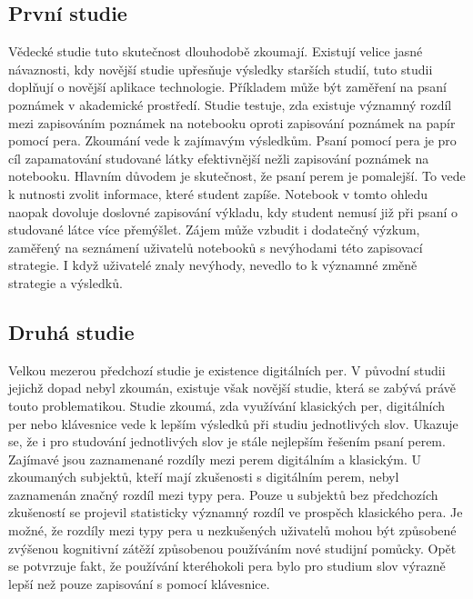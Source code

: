 \documentclass[journal]{IEEEtran}
\begin{document}
\subsection{První studie}
Vědecké studie tuto skutečnost dlouhodobě zkoumají.
Existují velice jasné návaznosti, kdy novější studie upřesňuje výsledky starších studií, tuto studii doplňují o novější aplikace technologie.
Příkladem může být zaměření na psaní poznámek v akademické prostředí.\cite{mightier_pen}
Studie testuje, zda existuje významný rozdíl mezi zapisováním poznámek na notebooku oproti zapisování poznámek na papír pomocí pera.
Zkoumání vede k zajímavým výsledkům.
Psaní pomocí pera je pro cíl zapamatování studované látky efektivnější nežli zapisování poznámek na notebooku.
Hlavním důvodem je skutečnost, že psaní perem je pomalejší.
To vede k nutnosti zvolit informace, které student zapíše.
Notebook v tomto ohledu naopak dovoluje doslovné zapisování výkladu, kdy student nemusí již při psaní o studované látce více přemýšlet.
Zájem může vzbudit i dodatečný výzkum, zaměřený na seznámení uživatelů notebooků s nevýhodami této zapisovací strategie.
I když uživatelé znaly nevýhody, nevedlo to k významné změně strategie a výsledků.

\subsection{Druhá studie}
Velkou mezerou předchozí studie je existence digitálních per.
V původní studii jejichž dopad nebyl zkoumán, existuje však novější studie, která se zabývá právě touto problematikou.
Studie zkoumá, zda využívání klasických per, digitálních per nebo klávesnice vede k lepším výsledků při studiu jednotlivých slov.\cite{advantage_of_handwriting}
Ukazuje se, že i pro studování jednotlivých slov je stále nejlepším řešením psaní perem.
Zajímavé jsou zaznamenané rozdíly mezi perem digitálním a klasickým.
U zkoumaných subjektů, kteří mají zkušenosti s digitálním perem, nebyl zaznamenán značný rozdíl mezi typy pera.
Pouze u subjektů bez předchozích zkušeností se projevil statisticky významný rozdíl ve prospěch klasického pera.
Je možné, že rozdíly mezi typy pera u nezkušených uživatelů mohou být způsobené zvýšenou kognitivní zátěží způsobenou používáním nové studijní pomůcky.
Opět se potvrzuje fakt, že používání kteréhokoli pera bylo pro studium slov výrazně lepší než pouze zapisování s pomocí klávesnice.
\end{document}
